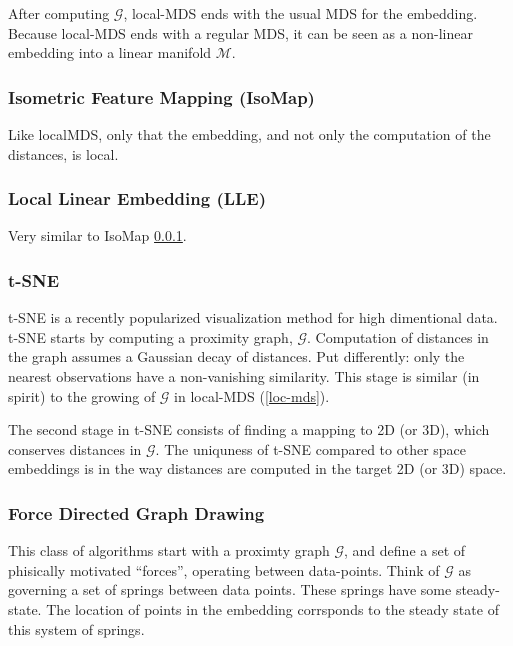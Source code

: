 \documentclass[]{book}
\theoremstyle{definition}
\theoremstyle{definition}
\theoremstyle{definition}
\theoremstyle{remark}
\begin{document}
After computing \(\mathcal{G}\), local-MDS ends with the usual MDS for the embedding.
Because local-MDS ends with a regular MDS, it can be seen as a non-linear embedding into a linear manifold \(\mathcal{M}\).

\hypertarget{isomap}{%
\subsubsection{Isometric Feature Mapping (IsoMap)}\label{isomap}}

Like localMDS, only that the embedding, and not only the computation of the distances, is local.

\hypertarget{local-linear-embedding-lle}{%
\subsubsection{Local Linear Embedding (LLE)}\label{local-linear-embedding-lle}}

Very similar to IsoMap \ref{isomap}.

\hypertarget{t-sne}{%
\subsubsection{t-SNE}\label{t-sne}}

t-SNE is a recently popularized visualization method for high dimentional data.
t-SNE starts by computing a proximity graph, \(\mathcal{G}\).
Computation of distances in the graph assumes a Gaussian decay of distances.
Put differently: only the nearest observations have a non-vanishing similarity.
This stage is similar (in spirit) to the growing of \(\mathcal{G}\) in local-MDS (\ref{loc-mds}).

The second stage in t-SNE consists of finding a mapping to 2D (or 3D), which conserves distances in \(\mathcal{G}\).
The uniquness of t-SNE compared to other space embeddings is in the way distances are computed in the target 2D (or 3D) space.

\hypertarget{force-directed-graph-drawing}{%
\subsubsection{Force Directed Graph Drawing}\label{force-directed-graph-drawing}}

This class of algorithms start with a proximty graph \(\mathcal{G}\), and define a set of phisically motivated ``forces'', operating between data-points.
Think of \(\mathcal{G}\) as governing a set of springs between data points.
These springs have some steady-state.
The location of points in the embedding corrsponds to the steady state of this system of springs.
\end{document}
